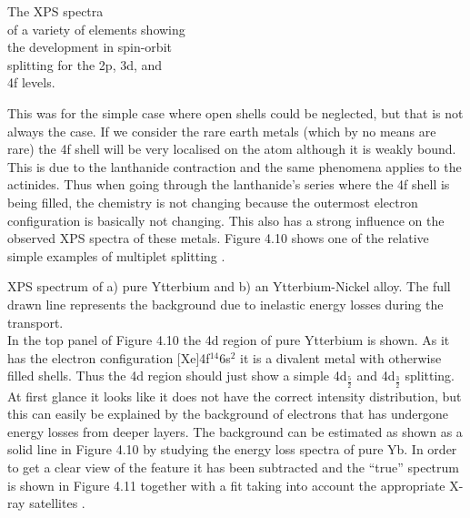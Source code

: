\vspace{1cm}

 The XPS spectra\\ of a variety of elements
        showing\\ the development in spin-orbit\\ splitting for the 2p,
       3d, and\\ 4f levels.\\

\vspace*{8cm}



             This was for the simple case where open shells could be
          neglected, but that is not always the case. If we consider
          the rare earth metals (which by no means are rare) the 4f
          shell will be very localised on the atom although it is
          weakly bound. This is due to the lanthanide contraction and
          the same phenomena applies to the actinides. Thus when going
          through the lanthanide's series where the 4f shell is being
          filled, the chemistry is not changing because the outermost
          electron configuration is basically not changing. This also
          has a strong influence on the observed XPS spectra of  these
          metals.  Figure  4.10  shows  one  of  the  relative  simple
          examples of multiplet splitting \cite{chorkendorff}.\\

\vspace{13cm}



             XPS spectrum of a) pure
        Ytterbium and b) an Ytterbium-Nickel alloy. The full drawn
       line represents the background due to inelastic energy
     losses during the transport.\\


             In the top panel of Figure 4.10  the 4d region of pure
          Ytterbium is shown. As it  has  the  electron  configuration
          [Xe]4f$^{14}$6s$^{2}$ it is a divalent metal with  otherwise
          filled shells. Thus the 4d region should just show a  simple
          4d$_{\frac{5}{2}}$  and  4d$_{\frac{3}{2}}$  splitting.   At
          first glance it looks like it  does  not  have  the  correct
          intensity distribution, but this can easily be explained  by
          the background of electrons that has undergone energy losses
          from deeper layers. The background can be estimated as shown
          as a solid line in Figure 4.10 by studying the  energy  loss
          spectra of pure Yb. In order to get  a  clear  view  of  the
          feature it has been subtracted and the ``true'' spectrum  is
          shown in Figure 4.11 together with a fit taking into account
          the  appropriate  X-ray  satellites   \cite{chorkendorff}.\\
          \vspace{13cm}

